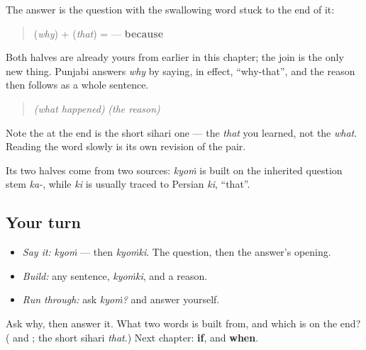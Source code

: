 \begin{cousinweb}
The answer is the question with the swallowing word stuck to the end of it:

\begin{quote}
\textbf{} (\emph{why}) + \textbf{} (\emph{that}) = \textbf{} — \textbf{because}
\end{quote}

Both halves are already yours from earlier in this chapter; the join is the only new thing. Punjabi answers \emph{why} by saying, in effect, \textquotedblleft{}why-that\textquotedblright{}, and the reason then follows as a whole sentence.

\begin{quote}
\emph{(what happened)} \textbf{} \emph{(the reason)}
\end{quote}

Note the \textbf{} at the end is the short sihari one — the \emph{that} you learned, not the \emph{what}. Reading the word slowly is its own revision of the pair.

Its two halves come from two sources: \emph{kyoṁ} is built on the inherited question stem \emph{ka-}, while \emph{ki} is usually traced to Persian \emph{ki}, \textquotedblleft{}that\textquotedblright{}.
\end{cousinweb}

\subsection*{Your turn}
\begin{itemize}
\raggedright
  \item \emph{Say it:} \emph{kyoṁ} — then \emph{kyoṁki}. The question, then the answer's opening.
  \item \emph{Build:} any sentence, \emph{kyoṁki}, and a reason.
  \item \emph{Run through:} ask \emph{kyoṁ?} and answer yourself.
\end{itemize}

\begin{tcolorbox}[breakable,colback=teal!4,colframe=teal!35!black,title={Before you move on}]
Ask why, then answer it. What two words is \textbf{} built from, and which \textbf{} is on the end? (\textbf{} and \textbf{}; the short sihari \emph{that}.) Next chapter: \textbf{if}, and \textbf{when}.
\end{tcolorbox}
